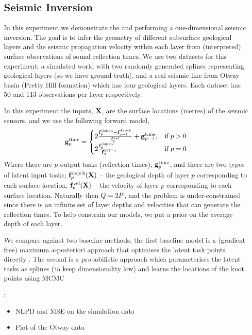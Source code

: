 \subsection{Seismic Inversion}

In this experiment we demonstrate the \eks and \uks performing a
one-dimensional seismic inversion. The goal is to infer the geometry of
different subsurface geological layers and the seismic propagation velocity
within each layer from (interpreted) surface observations of sound reflection
times. We use two datasets for this experiment; a simulated world with two
randomly generated splines representing geological layers (so we have
ground-truth), and a real seismic line from Otway basin (Pretty Hill formation)
which has four geological layers. Each dataset has 50 and 113 observations per
layer respectively.

In this experiment the inputs, $\mathbf{X}$, are the surface locations (metres) of
the seismic sensors, and we use the following forward model,
\begin{equation}
    \mathbf{g}_p^\text{time} =
    \begin{cases}
        2\frac{\mathbf{f}_p^\text{depth} - \mathbf{f}_{p-1}^\text{depth}}
        {\mathbf{f}_p^\text{vel}} + \mathbf{g}_{p-1}^\text{time},
        & \text{if } p > 0 \\
        2\frac{\mathbf{f}_0^\text{depth}}{\mathbf{f}_0^\text{vel}},
        & \text{if } p = 0
    \end{cases}
\end{equation}
Where there are $p$ output tasks (reflection times), $\mathbf{g}_p^\text{time}$,
and there are two types of latent input tasks;
$\mathbf{f}_p^\text{depth}\!\left({\mathbf{X}}\right)$ -- the geological depth of layer $p$
corresponding to each surface location, $\mathbf{f}_p^\text{vel}\!\left({\mathbf{X}}\right)$ --
the velocity of layer $p$ corresponding to each surface location. Naturally
then $Q = 2P$, and the problem is under-constrained since there is
an infinite set of layer depths and velocities that can generate the reflection
times. To help constrain our models, we put a prior on the average depth of
each layer.

We compare against two baseline methods, the first baseline model is a
(gradient free) maximum a-posteriori approach that optimises the latent task
points directly . The second is a
probabilistic approach which parameterises the latent tasks as splines (to keep
dimensionality low) and learns the locations of the knot points using MCMC

:
\begin{itemize}
    \item NLPD and MSE on the simulation data
    \item Plot of the Otway data
\end{itemize}
